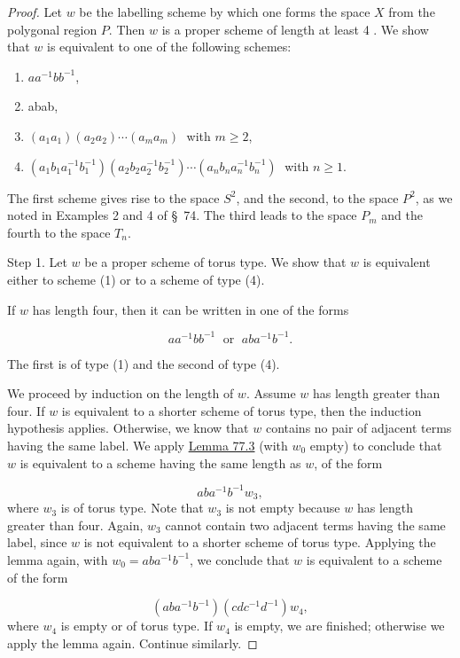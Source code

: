 \begin{proof}
	Let \(w\) be the labelling scheme by which one forms the space \(X\) from the polygonal region \(P\). Then \(w\) is a proper scheme of length at least 4 . We show that \(w\) is equivalent to one of the following schemes:
	\begin{enumerate}[itemsep=0.2em, parsep=0pt, topsep=0pt, partopsep=0pt, leftmargin=*, label=(\arabic*), align=left]
	\item \(aa^{-1}bb^{-1}\),
	\item abab,
	\item \(( {a_{1}a_{1}}) ( {a_{2}a_{2}}) \cdots ( {a_{m}a_{m}}) \;\) with \(m \geq 2\),
	\item \(( {a_{1}b_{1}a_1^{-1}b_1^{-1}}) ( {a_{2}b_{2}a_2^{-1}b_2^{-1}}) \cdots ( {a_{n}b_{n}a_n^{-1}b_n^{-1}}) \;\) with \(n \geq 1\).
	\end{enumerate}

The first scheme gives rise to the space \(S^{2}\), and the second, to the space \(P^{2}\), as we noted in Examples 2 and 4 of \S\ 74. The third leads to the space \(P_{m}\) and the fourth to the space \(T_{n}\).

Step 1. Let \(w\) be a proper scheme of torus type. We show that \(w\) is equivalent either to scheme (1) or to a scheme of type (4).

If \(w\) has length four, then it can be written in one of the forms

\[
aa^{-1}bb^{-1}\;\text{ or }\;{ab}a^{-1}b^{-1}.
\]

The first is of type (1) and the second of type (4).

We proceed by induction on the length of \(w\). Assume \(w\) has length greater than four. If \(w\) is equivalent to a shorter scheme of torus type, then the induction hypothesis applies. Otherwise, we know that \(w\) contains no pair of adjacent terms having the same label. We apply \hyperref[lem:77.3]{Lemma 77.3} (with \(w_{0}\) empty) to conclude that \(w\) is equivalent to a scheme having the same length as \(w\), of the form

\[
{ab}a^{-1}b^{-1}w_{3},
\]
where \(w_{3}\) is of torus type. Note that \(w_{3}\) is not empty because \(w\) has length greater than four. Again, \(w_{3}\) cannot contain two adjacent terms having the same label, since \(w\) is not equivalent to a shorter scheme of torus type. Applying the lemma again, with \(w_{0} = {ab}a^{-1}b^{-1}\), we conclude that \(w\) is equivalent to a scheme of the form

\[
( {{ab}a^{-1}b^{-1}}) ( {{cd}c^{-1}d^{-1}}) w_{4},
\]
where \(w_{4}\) is empty or of torus type. If \(w_{4}\) is empty, we are finished; otherwise we apply the lemma again. Continue similarly.


\end{proof}
